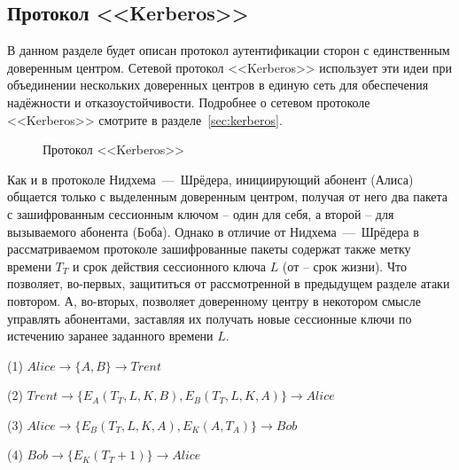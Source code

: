 \subsection{Протокол <<Kerberos>>}\label{section-protocols-kerberos}

В данном разделе будет описан протокол аутентификации сторон с единственным доверенным центром. Сетевой протокол <<Ker\-be\-ros>> использует эти идеи при объединении нескольких доверенных центров в единую сеть для обеспечения надёжности и отказоустойчивости. Подробнее о сетевом протоколе <<Kerberos>> смотрите в разделе~\ref{sec:kerberos}.

\begin{figure}
	\centering
	\begin{sequencediagram}

	\end{sequencediagram}
	\caption{Протокол <<Kerberos>>\label{fig:key_distribution-kerberos}}
\end{figure}

Как и в протоколе Нидхема~---~Шрёдера, инициирующий абонент (Алиса) общается только с выделенным доверенным центром, получая от него два пакета с зашифрованным сессионным ключом -- один для себя, а второй -- для вызываемого абонента (Боба). Однако в отличие от Нидхема~---~Шрёдера в рассматриваемом протоколе зашифрованные пакеты содержат также метку времени $T_T$ и срок действия сессионного ключа $L$ (от  -- срок жизни). Что позволяет, во-первых, защититься от рассмотренной в предыдущем разделе атаки повтором. А, во-вторых, позволяет доверенному центру в некотором смысле управлять абонентами, заставляя их получать новые сессионные ключи по истечению заранее заданного времени $L$.

\begin{protocol}
	\item[(1)] $ Alice \to \{ A, B \} \to Trent $
	\item[(2)] $ Trent \to \{ E_A \left( T_T, L, K, B \right), E_B \left( T_T, L, K, A \right) \} \to Alice $
	\item[(3)] $ Alice \to \{ E_B \left( T_T, L, K, A \right), E_K \left( A, T_A \right) \} \to Bob $
	\item[(4)] $ Bob \to \{ E_K \left( T_T + 1 \right) \} \to Alice $
\end{protocol}

